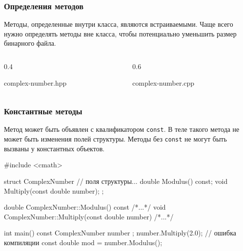 \documentclass[compress, 8pt, aspectratio=169]{beamer}
\begin{document}
\begin{frame}[fragile]

    \frametitle{Определения методов}

    Методы, определенные внутри класса, являются встраиваемыми.
    Чаще всего нужно определять методы вне класса, чтобы потенциально
    уменьшить размер бинарного файла.

    \begin{columns}[T]

        \begin{column}{0.4\textwidth}

                {complex-number.hpp}

        \end{column}

        \begin{column}{0.6\textwidth}

                {complex-number.cpp}

        \end{column}

    \end{columns}

\end{frame}

\begin{frame}[fragile]

    \frametitle{Константные методы}

    \hfill\break
    Метод может быть объявлен с квалификатором \verb|const|.
    В теле такого метода не может быть изменения полей структуры.
    Методы без \verb|const| не могут быть вызваны у константных объектов.

    \begin{myinplacelisting}[minted language=cpp]
#include <cmath>

struct ComplexNumber {
    // поля структуры...
    double Modulus() const;
    void Multiply(const double number);
};

double ComplexNumber::Modulus() const {/*...*/}
void ComplexNumber::Multiply(const double number)
{/*...*/}

int main() {
    const ComplexNumber number {};
    number.Multiply(2.0); // ошибка компиляции
    const double mod = number.Modulus();
}
    \end{myinplacelisting}

\end{frame}
\end{document}
